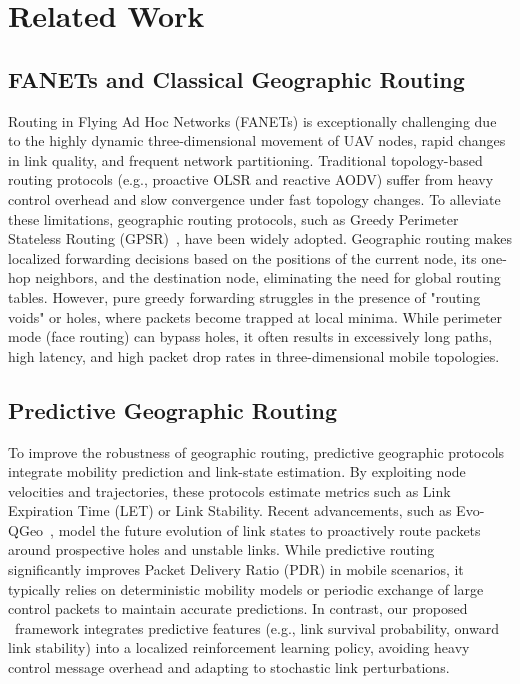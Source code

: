 \section{Related Work}
\label{sec:related_work}

\subsection{FANETs and Classical Geographic Routing}
Routing in Flying Ad Hoc Networks (FANETs) is exceptionally challenging due to the highly dynamic three-dimensional movement of UAV nodes, rapid changes in link quality, and frequent network partitioning. Traditional topology-based routing protocols (e.g., proactive OLSR and reactive AODV) suffer from heavy control overhead and slow convergence under fast topology changes. To alleviate these limitations, geographic routing protocols, such as Greedy Perimeter Stateless Routing (GPSR)~\cite{gpsr}, have been widely adopted. Geographic routing makes localized forwarding decisions based on the positions of the current node, its one-hop neighbors, and the destination node, eliminating the need for global routing tables. However, pure greedy forwarding struggles in the presence of "routing voids" or holes, where packets become trapped at local minima. While perimeter mode (face routing) can bypass holes, it often results in excessively long paths, high latency, and high packet drop rates in three-dimensional mobile topologies.

\subsection{Predictive Geographic Routing}
To improve the robustness of geographic routing, predictive geographic protocols integrate mobility prediction and link-state estimation. By exploiting node velocities and trajectories, these protocols estimate metrics such as Link Expiration Time (LET) or Link Stability. Recent advancements, such as Evo-QGeo~\cite{evoqgeo}, model the future evolution of link states to proactively route packets around prospective holes and unstable links. While predictive routing significantly improves Packet Delivery Ratio (PDR) in mobile scenarios, it typically relies on deterministic mobility models or periodic exchange of large control packets to maintain accurate predictions. In contrast, our proposed \method\ framework integrates predictive features (e.g., link survival probability, onward link stability) into a localized reinforcement learning policy, avoiding heavy control message overhead and adapting to stochastic link perturbations.

